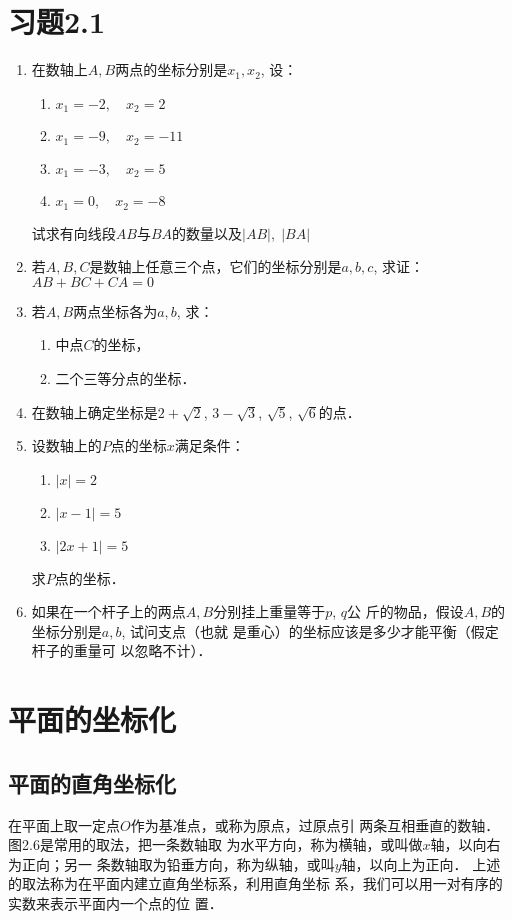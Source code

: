 \section*{习题2.1}
\begin{enumerate}
    \item 在数轴上$A,B$两点的坐标分别是$x_1,x_2$, 设：
\begin{multicols}{2}
\begin{enumerate}
    \item $x_1=-2,\quad x_2=2$
    \item $x_1=-9,\quad x_2=-11$
    \item $x_1=-3,\quad x_2=5$
    \item $x_1=0,\quad x_2=-8$
\end{enumerate}
\end{multicols}
试求有向线段$AB$与$BA$的数量以及$|AB|,\; |BA|$

\item 若$A,B,C$是数轴上任意三个点，它们的坐标分别是$a,
b,c$, 求证：$AB+BC+CA=0$
\item 若$A,B$两点坐标各为$a,b$, 求：
\begin{enumerate}
    \item 中点$C$的坐标，
    \item 二个三等分点的坐标．
\end{enumerate}

\item 
在数轴上确定坐标是$2+\sqrt{2}$, $3-\sqrt{3}$, $\sqrt{5}$, $\sqrt{6}$的点．
\item 
设数轴上的$P$点的坐标$x$满足条件：
\begin{enumerate}
    \item $|x|=2$
    \item $|x-1|=5$
    \item $|2x+1|=5$
\end{enumerate}
求$P$点的坐标．
\item 如果在一个杆子上的两点$A,B$分别挂上重量等于$p$, $q$公
斤的物品，假设$A,B$的坐标分别是$a,b$, 试问支点（也就
是重心）的坐标应该是多少才能平衡（假定杆子的重量可
以忽略不计）．


\end{enumerate}

\section{平面的坐标化}

\subsection{平面的直角坐标化}
在平面上取一定点$O$作为基准点，或称为原点，过原点引
两条互相垂直的数轴．图2.6是常用的取法，把一条数轴取
为水平方向，称为横轴，或叫做$x$轴，以向右为正向；另一
条数轴取为铅垂方向，称为纵轴，或叫$y$轴，以向上为正向．
上述的取法称为在平面内建立直角坐标系，利用直角坐标
系，我们可以用一对有序的实数来表示平面内一个点的位
置．

